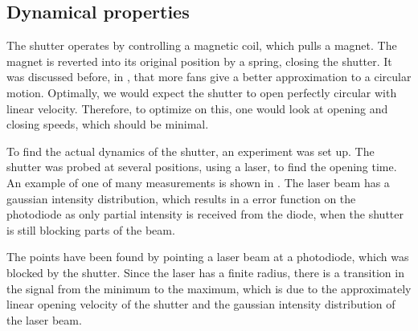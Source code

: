 \subsection{Dynamical properties}
The shutter operates by controlling a magnetic coil, which pulls a magnet. The magnet is reverted into its original position by a spring, closing the shutter. 
It was discussed before, in , that more fans give a better approximation to a circular motion. Optimally, we would expect the shutter to open perfectly circular with linear velocity. Therefore, to optimize on this, one would look at opening and closing speeds, which should be minimal.

\label{subsec:shutter_dynamical}

To find the actual dynamics of the shutter, an experiment was set up. The shutter was probed at several positions, using a laser, to find the opening time. An example of one of many measurements is shown in . The laser beam has a gaussian intensity distribution, which results in a error function on the photodiode as only partial intensity is received from the diode, when the shutter is still blocking parts of the beam.

The points have been found by pointing a laser beam at a photodiode, which was blocked by the shutter. Since the laser has a finite radius, there is a transition in the signal from the minimum to the maximum, which is due to the approximately linear opening velocity of the shutter and the gaussian intensity distribution of the laser beam.

